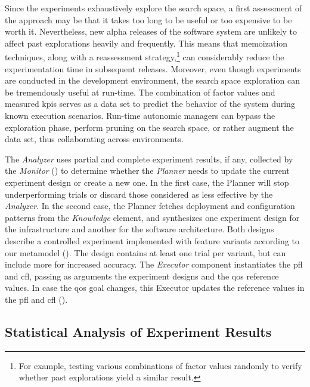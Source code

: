 Since the experiments exhaustively explore the search space, a first assessment of the approach may be that it takes too long to be useful or too expensive to be worth it. Nevertheless, new alpha releases of the software system are unlikely to affect past explorations heavily and frequently. This means that memoization techniques, along with a reassessment strategy,\footnote{For example, testing various combinations of factor values randomly to verify whether past explorations yield a similar result.} can considerably reduce the experimentation time in subsequent releases. Moreover, even though experiments are conducted in the development environment, the search space exploration can be tremendously useful at run-time. The combination of factor values and measured \glspl{kpi} serves as a data set to predict the behavior of the system during known execution scenarios. Run-time autonomic managers can bypass the exploration phase, perform pruning on the search space, or rather augment the data set, thus collaborating across environments.

The \emph{Analyzer} uses partial and complete experiment results, if any, collected by the \emph{Monitor} () to determine whether the \emph{Planner} needs to update the current experiment design or create a new one. In the first case, the Planner will stop underperforming trials or discard those considered as less effective by the \emph{Analyzer}. In the second case, the Planner fetches deployment and configuration patterns from the \emph{Knowledge} element, and synthesizes one experiment design for the infrastructure and another for the software architecture. Both designs describe a controlled experiment implemented with feature variants according to our metamodel (). The design contains at least one trial per variant, but can include more for increased accuracy. The \emph{Executor} component instantiates the \gls{pfl} and \gls{cfl}, passing as arguments the experiment designs and the \gls{qos} reference values. In case the \gls{qos} goal changes, this Executor updates the reference values in the \gls{pfl} and \gls{cfl} ().

\subsection{Statistical Analysis of Experiment Results}

